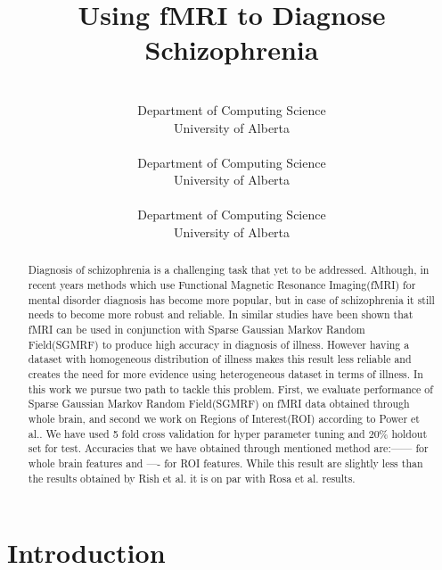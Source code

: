 \documentclass{article} %
\title{Using fMRI to Diagnose Schizophrenia}
\author{%
	\\
	Department of Computing Science\\
	University of Alberta\\
	\texttt{} 
\And 
 \\
Department of Computing Science\\
University of Alberta\\
\texttt{}
\And 
\\
Department of Computing Science\\
University of Alberta\\
\texttt{}  
}
\begin{document}
	\maketitle
	\begin{abstract}
			Diagnosis of schizophrenia is a challenging task that yet to be addressed\cite{McGuire200891}. Although, in recent years methods which use Functional Magnetic Resonance Imaging(fMRI) for mental disorder diagnosis has become more popular, but in case of schizophrenia it still needs to become more robust and reliable. In similar studies\cite{Rish_2013}\cite{Rosa_2013} have been shown that fMRI can be used in conjunction with Sparse Gaussian Markov Random Field(SGMRF) to produce high accuracy in diagnosis of illness. However having a dataset with homogeneous distribution of illness makes this result less reliable and creates the need for more evidence using heterogeneous dataset in terms of illness. In this work we pursue two path to tackle this problem. First, we evaluate performance of Sparse Gaussian Markov Random Field(SGMRF) on fMRI data obtained through whole brain, and second we work on Regions of Interest(ROI) according to Power et al.\cite{Power_2011}. We have used 5 fold cross validation for hyper parameter tuning and 20\% holdout set for test. Accuracies that we have obtained through mentioned method are:------ for whole brain features and ---- for ROI features. While this result are slightly less than the results obtained by Rish et al. it is on par with Rosa et al. results.  
	\end{abstract}
	\section{Introduction}

	
	
	
	
\end{document}
